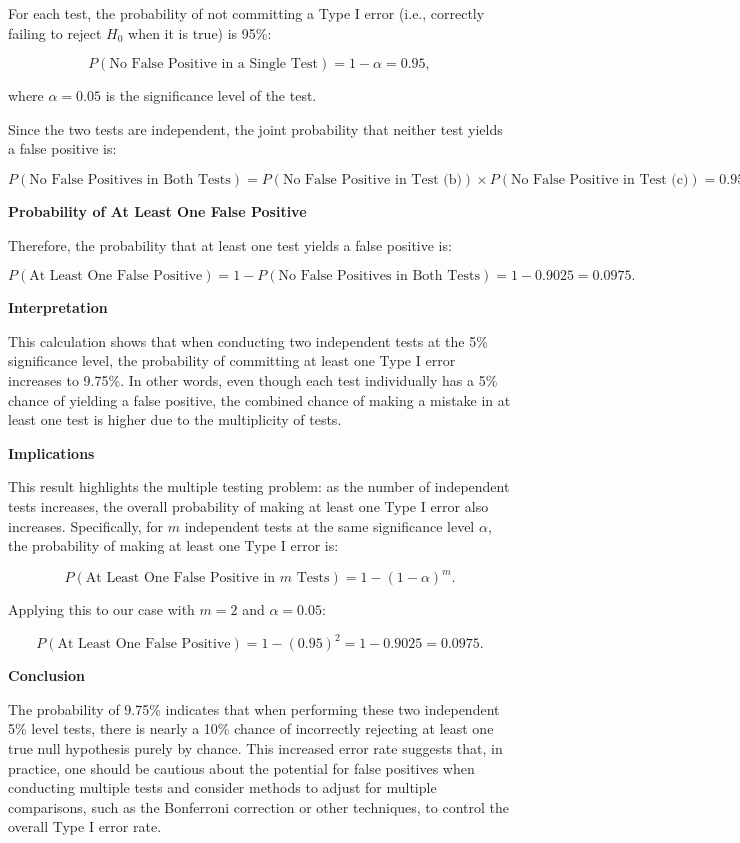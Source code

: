 \documentclass{article}
\begin{document}
For each test, the probability of not committing a Type I error (i.e., correctly failing to reject \( H_0 \) when it is true) is 95\%:

\[
P(\text{No False Positive in a Single Test}) = 1 - \alpha = 0.95,
\]

where \( \alpha = 0.05 \) is the significance level of the test.

Since the two tests are independent, the joint probability that neither test yields a false positive is:

\[
P(\text{No False Positives in Both Tests}) = P(\text{No False Positive in Test (b)}) \times P(\text{No False Positive in Test (c)}) = 0.95 \times 0.95 = 0.9025.
\]

\textbf{Probability of At Least One False Positive}

Therefore, the probability that at least one test yields a false positive is:

\[
P(\text{At Least One False Positive}) = 1 - P(\text{No False Positives in Both Tests}) = 1 - 0.9025 = 0.0975.
\]

\textbf{Interpretation}

This calculation shows that when conducting two independent tests at the 5\% significance level, the probability of committing at least one Type I error increases to 9.75\%. In other words, even though each test individually has a 5\% chance of yielding a false positive, the combined chance of making a mistake in at least one test is higher due to the multiplicity of tests.

\textbf{Implications}

This result highlights the multiple testing problem: as the number of independent tests increases, the overall probability of making at least one Type I error also increases. Specifically, for \( m \) independent tests at the same significance level \( \alpha \), the probability of making at least one Type I error is:

\[
P(\text{At Least One False Positive in } m \text{ Tests}) = 1 - (1 - \alpha)^m.
\]

Applying this to our case with \( m = 2 \) and \( \alpha = 0.05 \):

\[
P(\text{At Least One False Positive}) = 1 - (0.95)^2 = 1 - 0.9025 = 0.0975.
\]

\textbf{Conclusion}

The probability of 9.75\% indicates that when performing these two independent 5\% level tests, there is nearly a 10\% chance of incorrectly rejecting at least one true null hypothesis purely by chance. This increased error rate suggests that, in practice, one should be cautious about the potential for false positives when conducting multiple tests and consider methods to adjust for multiple comparisons, such as the Bonferroni correction or other techniques, to control the overall Type I error rate.
\end{document}
